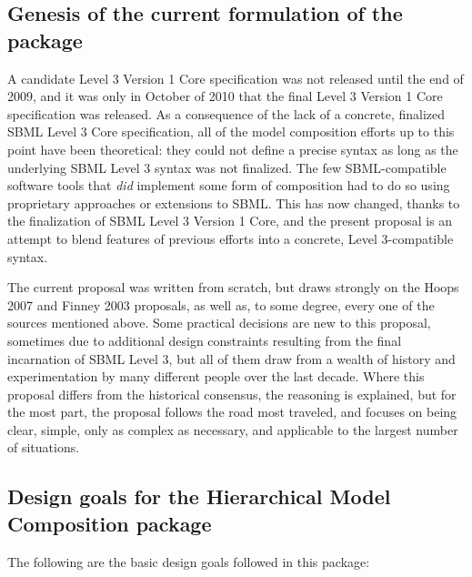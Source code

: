 \subsection{Genesis of the current formulation of the package}

A candidate Level 3 Version 1 Core specification was not released until
the end of 2009, and it was only in October of 2010 that the final Level
3 Version 1 Core specification was released.  As a consequence of the
lack of a concrete, finalized SBML Level 3 Core specification, all of
the model composition efforts up to this point have been theoretical:
they could not define a precise syntax as long as the underlying SBML
Level 3 syntax was not finalized.  The few SBML-compatible software
tools that \emph{did} implement some form of composition had to do so
using proprietary approaches or extensions to SBML. This has now
changed, thanks to the finalization of SBML Level 3 Version 1 Core, and
the present proposal is an attempt to blend features of previous efforts
into a concrete, Level 3-compatible syntax.

The current proposal was written from scratch, but draws strongly on the
Hoops 2007 and Finney 2003 proposals, as well as, to some degree, every
one of the sources mentioned above.  Some practical decisions are new to
this proposal, sometimes due to additional design constraints resulting
from the final incarnation of SBML Level 3, but all of them draw from a
wealth of history and experimentation by many different people over the
last decade.  Where this proposal differs from the historical consensus,
the reasoning is explained, but for the most part, the proposal follows
the road most traveled, and focuses on being clear, simple, only as
complex as necessary, and applicable to the largest number of
situations.


\subsection{Design goals for the Hierarchical Model Composition package}
\label{sec:design-goals}

The following are the basic design goals followed in this package:

